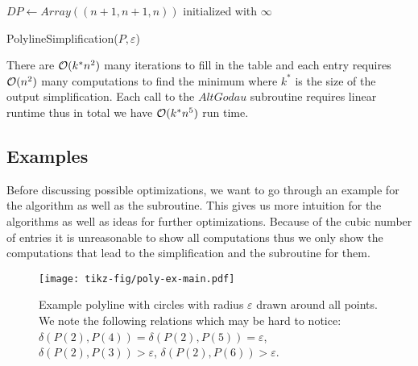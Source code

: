 \begin{algorithm}[ht]
  \DontPrintSemicolon
  \BlankLine
  \(DP \gets Array((n + 1, n + 1, n))\) initialized with \(\infty\) \;
  \caption{PolylineSimplification(\(P, \varepsilon\))}
  \label{algo:simplify_simple}
\end{algorithm}

There are \(\mathcal{O}(k^* n^2)\) many iterations to fill in the table and each entry requires \(\mathcal{O}(n^2)\) many computations to find the minimum where \(k^*\) is the size of the output simplification. Each call to the \(AltGodau\) subroutine requires linear runtime thus in total we have \(\mathcal{O}(k^*n^5)\) run time.

\subsection{Examples}
Before discussing possible optimizations, we want to go through an example for the algorithm as well as the \citeauthor{computing_the_frechet_distance_between_two_polygonal_curves} subroutine. This gives us more intuition for the algorithms as well as ideas for further optimizations. Because of the cubic number of entries it is unreasonable to show all computations thus we only show the computations that lead to the simplification and the subroutine for them. 

\begin{figure}
  \centering
  \texttt{[image: tikz-fig/poly-ex-main.pdf]}
  \caption{Example polyline with circles with radius \(\varepsilon\) drawn around all points. We note the following relations which may be hard to notice: \(\delta(P(2), P(4)) = \delta(P(2), P(5)) = \varepsilon\), \(\delta(P(2), P(3)) > \varepsilon\), \(\delta(P(2), P(6)) > \varepsilon\).}
  \label{fig:poly-ex-main}
\end{figure}

